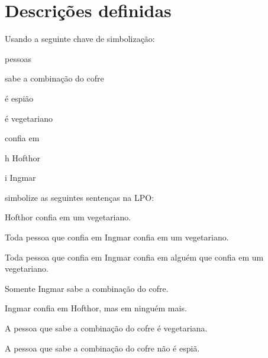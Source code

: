 \chapter{Descrições definidas}\setcounter{ProbPart}{0}
\problempart
Usando a seguinte chave de simbolização:
\begin{ekey}
\item[\text{domínio}] pessoas
\item[\atom{K}{x}]  sabe a combinação do cofre
\item[\atom{S}{x}]  é espião
\item[\atom{V}{x}]  é vegetariano
\item[\atom{T}{x,y}]  confia em 
\item[h] Hofthor
\item[i] Ingmar
\end{ekey}
simbolize as seguintes sentenças na LPO:
\begin{compactlist}
\item Hofthor confia em um vegetariano.
\item[] 
\item Toda pessoa que confia em Ingmar confia em um vegetariano.
\item[] 
\item Toda pessoa que confia em Ingmar confia em alguém que confia em um vegetariano.
\item[] 
\item Somente Ingmar sabe a combinação do cofre.
\item[] 
\item Ingmar confia em Hofthor, mas em ninguém mais.
\item[] 
\item A pessoa que sabe a combinação do cofre é vegetariana.
\item[] 
\item A pessoa que sabe a combinação do cofre não é espiã.
\item[] 
\end{compactlist}



